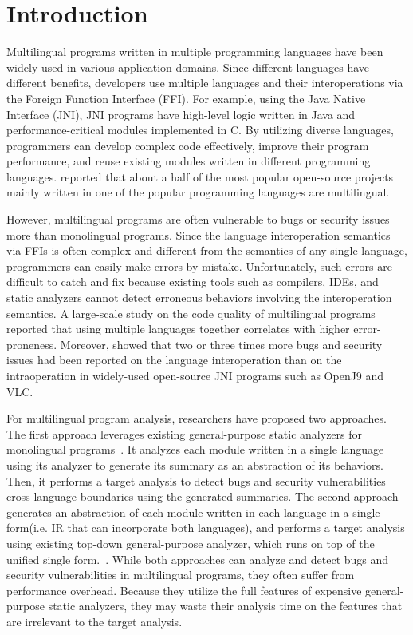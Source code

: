 \section{Introduction}
Multilingual programs written in multiple programming languages
have been widely used in various application domains.
Since different languages have different benefits,
developers use multiple languages and their interoperations
via the Foreign Function Interface (FFI). For example, using the Java Native Interface (JNI),
JNI programs have high-level logic written in Java and performance-critical
modules implemented in C. By utilizing diverse languages, programmers can
develop complex code effectively, improve their program performance,
and reuse existing modules written in different programming languages.
\citet{kochhar2016large} reported that about a half of the most popular open-source
projects mainly written in one of the popular programming languages are
multilingual.

However, multilingual programs are often vulnerable to bugs or security issues
more than monolingual programs. Since the language interoperation semantics
via FFIs is often complex and different from the semantics of any
single language, programmers can easily make errors by mistake.
Unfortunately, such errors are difficult to catch and fix because existing
tools such as compilers, IDEs, and static analyzers cannot detect erroneous
behaviors involving the interoperation semantics.
A large-scale study on the code quality of multilingual programs~\cite{kochhar2016large}
reported that using multiple languages together correlates with higher error-proneness.  
Moreover, \citet{grichi2020impact} showed that two or three times more
bugs and security issues had been reported on the language
interoperation than on the intraoperation in widely-used open-source JNI
programs such as OpenJ9 and VLC.

For multilingual program analysis, researchers have proposed two approaches.
The first approach leverages existing general-purpose static analyzers for monolingual
programs~\cite{JN-SAF, LeeASE20}.  It analyzes each module
written in a single language using its analyzer to generate
its summary as an abstraction of its behaviors.  Then, it performs a target
analysis to detect bugs and security vulnerabilities cross language boundaries
using the generated summaries. The second approach generates an abstraction
of each module written in each language in a single form(i.e. IR that can
incorporate both languages), and performs
a target analysis using existing top-down general-purpose analyzer, which 
runs on top of the unified single form.~\cite{hybridroid, cpython}.
While both approaches can analyze and detect bugs and security vulnerabilities
in multilingual programs, they often suffer from performance overhead.
Because they utilize the full features of expensive general-purpose static analyzers,
they may waste their analysis time on the features that are irrelevant to
the target analysis.

